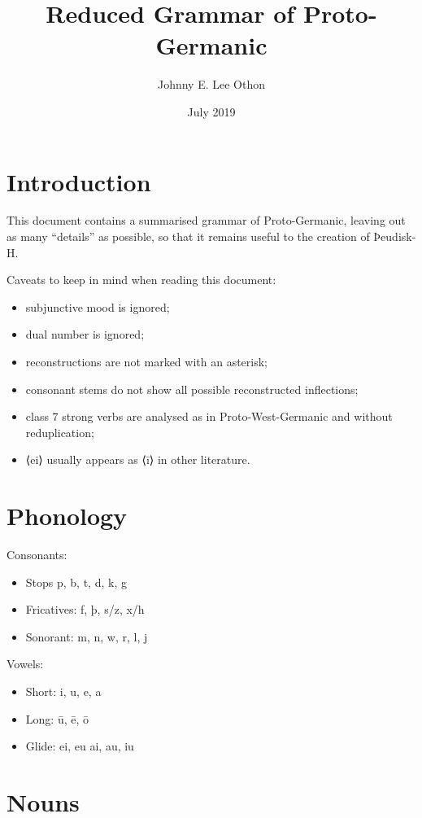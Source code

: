 \documentclass{article}
\title{Reduced Grammar of Proto-Germanic}
\author{Johnny E. Lee Othon }
\date{July 2019}
\begin{document}
\maketitle

\section{Introduction}

This document contains a summarised grammar of Proto-Germanic, leaving out as many ``details'' as possible, so that it remains useful to the creation of Þeudisk-H.

Caveats to keep in mind when reading this document:

\begin{itemize}
\item subjunctive mood is ignored;
\item dual number is ignored;
\item reconstructions are not marked with an asterisk;
\item consonant stems do not show all possible reconstructed inflections;
\item class 7 strong verbs are analysed as in Proto-West-Germanic and without reduplication;
\item ⟨ei⟩ usually appears as ⟨ī⟩ in other literature.
\end{itemize}

\section{Phonology}

Consonants:

\begin{itemize}
\item {Stops p, b, t, d, k, g}
\item {Fricatives: f, þ, s/z, x/h}
\item {Sonorant: m, n, w, r, l, j}
\end{itemize}

Vowels:

\begin{itemize}
\item{Short: i, u, e, a}
\item{Long: ū, ē, ō}
\item{Glide: ei, eu ai, au, iu}
\end{itemize}

\section{Nouns}
\end{document}
